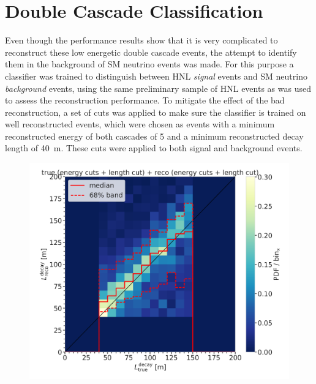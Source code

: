 

\section{Double Cascade Classification}

Even though the performance results show that it is very complicated to reconstruct these low energetic double cascade events, the attempt to identify them in the background of SM neutrino events was made. For this purpose a classifier was trained to distinguish between HNL \textit{signal} events and SM neutrino \textit{background} events, using the same preliminary sample of HNL events as was used to assess the reconstruction performance. To mitigate the effect of the bad reconstruction, a set of cuts was applied to make sure the classifier is trained on well reconstructed events, which were chosen as events with a minimum reconstructed energy of both cascades of \SI{5}{\gev} and a minimum reconstructed decay length of \SI{40}{\meter}. These cuts were applied to both signal and background events.

\begin{figure}[h]
    \centering
    \includegraphics{figures/results/190607/classification/reco_decayL_vs_true_decayL_reco_energy_cut_and_reco_length_cut_and_true_energy_cut_and_true_length_cut_step_contours_weighted.png}
    \caption[]{}
\end{figure}

